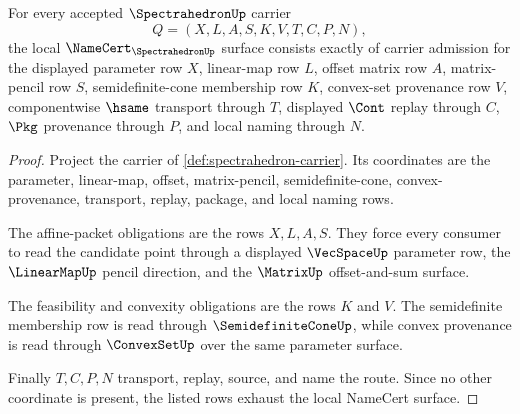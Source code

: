 \begin{theorem}
\label{thm:spectrahedron-namecert-obligations}
For every accepted $\SpectrahedronUp$ carrier
$$
Q=(X,L,A,S,K,V,T,C,P,N),
$$
the local $\NameCert_{\SpectrahedronUp}$ surface consists exactly of carrier admission for the displayed parameter row $X$, linear-map row $L$, offset matrix row $A$, matrix-pencil row $S$, semidefinite-cone membership row $K$, convex-set provenance row $V$, componentwise $\hsame$ transport through $T$, displayed $\Cont$ replay through $C$, $\Pkg$ provenance through $P$, and local naming through $N$.
\end{theorem}
\begin{proof}
Project the carrier of \autoref{def:spectrahedron-carrier}. Its coordinates are the parameter, linear-map, offset, matrix-pencil, semidefinite-cone, convex-provenance, transport, replay, package, and local naming rows.

The affine-packet obligations are the rows $X,L,A,S$. They force every consumer to read the candidate point through a displayed $\VecSpaceUp$ parameter row, the $\LinearMapUp$ pencil direction, and the $\MatrixUp$ offset-and-sum surface.

The feasibility and convexity obligations are the rows $K$ and $V$. The semidefinite membership row is read through $\SemidefiniteConeUp$, while convex provenance is read through $\ConvexSetUp$ over the same parameter surface.

Finally $T,C,P,N$ transport, replay, source, and name the route. Since no other coordinate is present, the listed rows exhaust the local NameCert surface.
\end{proof}

